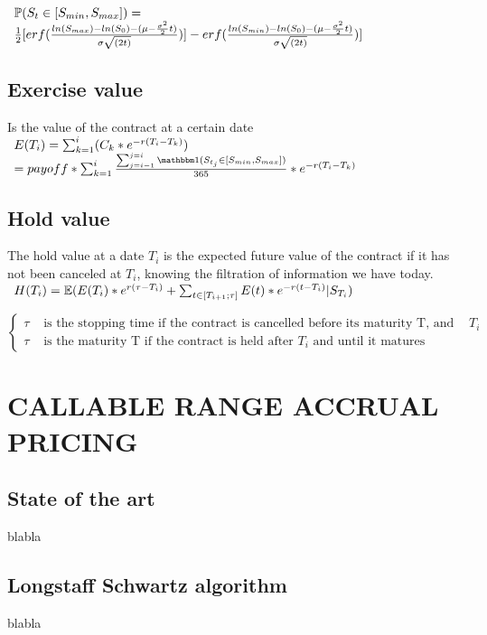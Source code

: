 \documentclass[12pt]{article}
\begin{document}
 					$\begin{array}{lcl}
 					\mathbb{P}(S_t \in [S_{min},S_{max}]) =\\ \frac{1}{2}[erf(\frac{ln(S_{max})-ln(S_0)-(\mu-\frac{\sigma^2}{2}t)}{\sigma \sqrt{(2t)}})]-erf(\frac{ln(S_{min})-ln(S_0)-(\mu-\frac{\sigma^2}{2}t)}{\sigma \sqrt{(2t)}})]
 					\end{array}$
	 	\subsection{Exercise value}
	 	
		 	Is the value of the contract at a certain date\\
		 	$\begin{array}{lcl}
			 	E(T_i) = \sum_{k = 1}^{i} (C_k * e^{-r(T_i - T_k)})\\
			 	=payoff * \sum_{k=1}^{i}\frac{\sum_{j=i - 1}^{j=i}\indicator (S_{t_j} \in [S_{min},S_{max}])}{365} * e^{-r(T_i - T_k)}
		 	\end{array}$
		 	
		 	
	 	\subsection{Hold value}
	 	The hold value at a date $T_i$ is the expected future value of the contract if it has not been canceled at $T_i$, knowing the filtration of information we have today.
	 	$\begin{array}{lcl}
		 	H(T_i) = \mathbb{E}(E(T_{i}) * e^{r(\tau-T_i)} + \sum_{t \in[T_{i+1}; \tau ]}E(t)*e^{-r(t - T_i)}|S_{T_i})
	 	\end{array}$
	 	
	 	$$
		\left\{
		 	\begin{array}{ll}
		 	\tau & \mbox{ is the stopping time if the contract is cancelled before its maturity T, and after $T_i$} \\
		 	\tau & \mbox{ is the maturity T if the contract is held after $T_i$  and until it matures}
		 	\end{array}
	\right.
	 	$$
	\section{CALLABLE RANGE ACCRUAL PRICING}
	\subsection{State of the art}
	blabla
	\subsection{Longstaff Schwartz algorithm}
	blabla
\end{document}

